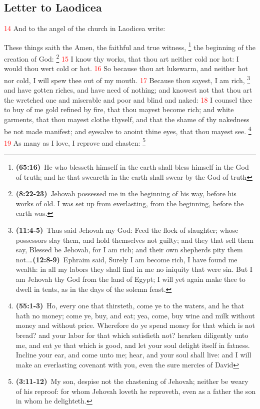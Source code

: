 \documentclass[12pt,twoside]{memoir}
\newcommand{\cbibleref}[3]{\textbf{\ibibleverse{#1}(#2)}\ {#3}}
\newcommand{\cbiblefoot}[3]{\footnote{\cbibleref{#1}{#2}{#3}}}
\newcommand{\cbiblefootduo}[6]{\footnote{\cbibleref{#1}{#2}{#3}\ldots \cbibleref{#4}{#5}{#6}}}
\newcommand{\vnum}[1]{\textcolor{red}{\normalsize{#1}}}
\begin{document}
\subsection*{Letter to Laodicea}
\vnum{14} And to the angel of the church in Laodicea write:

These things saith the Amen, the faithful and true witness,%
	\cbiblefoot{Isaiah}{65:16}{He who blesseth himself in the earth shall bless himself in the God of truth; and he that sweareth in the earth shall swear by the God of truth}
 the beginning of the creation of God:%
 	\cbiblefoot{Proverbs}{8:22-23}{Jehovah possessed me in the beginning of his way, before his works of old. I was set up from everlasting, from the beginning, before the earth was.} %
\vnum{15} I know thy works, that thou art neither cold nor hot: I would thou wert cold or hot. %
\vnum{16} So because thou art lukewarm, and neither hot nor cold, I will spew thee out of my mouth. %
\vnum{17} Because thou sayest, I am rich,%
	\cbiblefootduo{Zechariah}{11:4-5}{Thus said Jehovah my God: Feed the flock of slaughter; whose possessors slay them, and hold themselves not guilty; and they that sell them say, Blessed be Jehovah, for I am rich; and their own shepherds pity them not.}	
				{Hosea}{12:8-9}{Ephraim said, Surely I am become rich, I have found me wealth: in all my labors they shall find in me no iniquity that were sin. But I am Jehovah thy God from the land of Egypt; I will yet again make thee to dwell in tents, as in the days of the solemn feast.}
 and have gotten riches, and have need of nothing; and knowest not that thou art the wretched one and miserable and poor and blind and naked: %
\vnum{18} I counsel thee to buy of me gold refined by fire, that thou mayest become rich; and white garments, that thou mayest clothe thyself, and that the shame of thy nakedness be not made manifest; and eyesalve to anoint thine eyes, that thou mayest see.%
	\cbiblefoot{Isaiah}{55:1-3}{Ho, every one that thirsteth, come ye to the waters, and he that hath no money; come ye, buy, and eat; yea, come, buy wine and milk without money and without price. Wherefore do ye spend money for that which is not bread? and your labor for that which satisfieth not? hearken diligently unto me, and eat ye that which is good, and let your soul delight itself in fatness. Incline your ear, and come unto me; hear, and your soul shall live: and I will make an everlasting covenant with you, even the sure mercies of David} %
\vnum{19} As many as I love, I reprove and chasten:%
	\cbiblefoot{Proverbs}{3:11-12}{My son, despise not the chastening of Jehovah; neither be weary of his reproof: for whom Jehovah loveth he reproveth, even as a father the son in whom he delighteth.}
\end{document}
